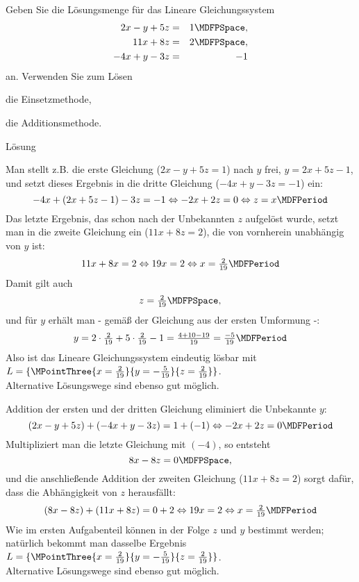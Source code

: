 \begin{MExercises}
\begin{MExercise}
Geben Sie die Lösungsmenge für das Lineare Gleichungssystem
\begin{eqnarray*}
2 x - y + 5 z & = & 1 \MDFPSpace, \\ 11 x + 8 z & = & 2 \MDFPSpace, \\ - 4 x + y - 3 z & = & - 1
\end{eqnarray*}
an. Verwenden Sie zum Lösen
\begin{MExerciseItems}
\item{die Einsetzmethode,}
\item{die Additionsmethode.}
\end{MExerciseItems}

\begin{MHint}{Lösung}
\begin{MExerciseItems}
\item{Man stellt z.B. die erste Gleichung ($2 x - y + 5 z = 1$) nach $y$ frei, $y = 2 x + 5 z - 1$,
und setzt dieses Ergebnis in die dritte Gleichung ($- 4 x + y - 3 z = - 1$) ein:
$$- 4 x + (2 x + 5 z - 1) - 3 z = - 1 \Leftrightarrow - 2 x + 2 z = 0 \Leftrightarrow z = x \MDFPeriod$$
Das letzte Ergebnis, das schon nach der Unbekannten $z$ aufgelöst wurde, setzt man in die zweite
Gleichung ein ($11 x + 8 z = 2$), die von vornherein unabhängig von $y$ ist:
$$11 x + 8 x = 2 \Leftrightarrow 19 x = 2 \Leftrightarrow x = \Mtfrac{2}{19} \MDFPeriod$$
Damit gilt auch
$$z = \Mtfrac{2}{19} \MDFPSpace ,$$
und für $y$ erhält man - gemäß der Gleichung aus der ersten Umformung -:
$$y = 2 \cdot \Mtfrac{2}{19} + 5 \cdot \Mtfrac{2}{19} - 1 = \Mtfrac{4 + 10 - 19}{19} = \Mtfrac{-5}{19} \MDFPeriod$$
Also ist das Lineare Gleichungssystem eindeutig lösbar mit ${\ML} = \{ \MPointThree{x = \Mtfrac{2}{19}}{
y = - \Mtfrac{5}{19}}{ z = \Mtfrac{2}{19}} \}$.\\
Alternative Lösungswege sind ebenso gut möglich.}
\item{Addition der ersten und der dritten Gleichung eliminiert die Unbekannte $y$:
$$(2 x - y + 5 z) + (- 4 x + y - 3 z) = 1 + (- 1) \Leftrightarrow - 2 x + 2 z = 0 \MDFPeriod$$
Multipliziert man die letzte Gleichung mit $(- 4)$, so entsteht
$$8 x - 8 z = 0 \MDFPSpace ,$$
und die anschließende Addition der zweiten Gleichung ($11 x  + 8 z = 2$) sorgt dafür, dass die Abhängigkeit
von $z$ herausfällt:
$$(8 x - 8 z) + (11 x + 8 z) = 0 + 2 \Leftrightarrow 19 x = 2 \Leftrightarrow x = \Mtfrac{2}{19} \MDFPeriod$$
Wie im ersten Aufgabenteil können in der Folge $z$ und $y$ bestimmt werden; natürlich bekommt man
dasselbe Ergebnis ${\ML} = \{ \MPointThree{x = \Mtfrac{2}{19}}{y = - \Mtfrac{5}{19}}{z = \Mtfrac{2}{19}} \}$.\\
Alternative Lösungswege sind ebenso gut möglich.}
\end{MExerciseItems}
\end{MHint}
\end{MExercise}


\end{MExercises}
